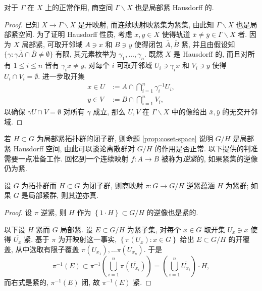 \begin{proposition}\label{prop:quot-Hausdorff}
	对于 $\Gamma$ 在 $X$ 上的正常作用, 商空间 $\Gamma \backslash X$ 也是局部紧 Hausdorff 的.
\end{proposition}
\begin{proof}
	已知 $X \to \Gamma \backslash X$ 是开映射, 而连续映射映紧集为紧集, 由此知 $\Gamma \backslash X$ 也是局部紧空间. 为了证明 Hausdorff 性质, 考虑 $x, y \in X$ 使得轨道 $\bar{x} \neq \bar{y} \in \Gamma \backslash X$ 者. 因为 $X$ 局部紧, 可取开邻域 $A \ni x$ 和 $B \ni y$ 使得闭包 $\bar{A}, \bar{B}$ 紧, 并且由假设知 $\{\gamma : \gamma\bar{A} \cap \bar{B} \neq \emptyset \}$ 有限, 其元素枚举为 $\gamma_1, \ldots, \gamma_n$. 既然 $X$ 是 Hausdorff 的, 而且对所有 $1 \leq i \leq n$ 皆有 $\gamma_i x \neq y$, 对每个 $i$ 可取开邻域 $U_i \ni \gamma_i x$ 和 $V_i \ni y$ 使得 $U_i \cap V_i = \emptyset$. 进一步取开集
	\begin{align*}
		x \in U & := A \cap \bigcap_{i=1}^n \gamma_i^{-1} U_i, \\
		y \in V & := B \cap \bigcap_{i=1}^n V_i,
	\end{align*}
	以确保 $\gamma U \cap V = \emptyset$ 对所有 $\gamma$ 成立, 那么 $U, V$ 在 $\Gamma \backslash X$ 中的像给出 $\bar{x}, \bar{y}$ 的无交开邻域.
\end{proof}

若 $H \subset G$ 为局部紧拓扑群的闭子群, 则命题 \ref{prop:coset-space} 说明 $G/H$ 是局部紧 Hausdorff 空间, 由此可以谈论离散群对 $G/H$ 的作用是否正常. 以下提供的判准需要一点准备工作. 回忆到一个连续映射 $f: A \to B$ 被称为\emph{逆紧}的, 如果紧集的逆像仍为紧.

\begin{lemma}\label{prop:proper-quotient-compact}
	设 $G$ 为拓扑群而 $H \subset G$ 为闭子群, 则商映射 $\pi: G \to G/H$ 逆紧蕴涵 $H$ 为紧群; 如果 $G$ 是局部紧群, 则其逆亦真.
\end{lemma}
\begin{proof}
	设 $\pi$ 逆紧, 则 $H$ 作为 $\left\{ 1 \cdot H \right\} \subset G/H$ 的逆像也是紧的.
	
	以下设 $H$ 紧而 $G$ 局部紧. 设 $E \subset G/H$ 为紧子集, 对每个 $x \in G$ 取开集 $U_x \ni x$ 使得 $\overline{U_x}$ 紧. 基于 $\pi$ 为开映射这一事实, $\left\{\pi(U_x): x \in G \right\}$ 给出 $E \subset G/H$ 的开覆盖, 从中选取有限子覆盖 $\pi(U_{x_1}), \ldots \pi(U_{x_n})$. 于是
	\[ \pi^{-1}(E) \subset \pi^{-1}\left( \bigcup_{i=1}^n \pi\left(\overline{U_{x_i}}\right) \right) = \left( \bigcup_{i=1}^n \overline{U_{x_i}} \right) \cdot H, \]
	而右式是紧的, $\pi^{-1}(E)$ 闭, 故 $\pi^{-1}(E)$ 紧.
\end{proof}

